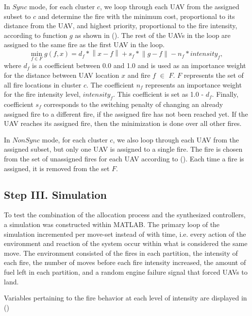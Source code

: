 \documentclass[journal]{IEEEtran}
\newcommand{\norm}[1]{\left\lVert#1\right\rVert}
\begin{document}
In $Sync$  mode, for each cluster $c$, we loop through each UAV from the assigned subset to $c$ and determine the fire with the minimum cost, proportional to its distance from the UAV, and highest priority, proportional to the fire intensity, according to function $g$ as shown in (). The rest of the UAVs in the loop are assigned to the same fire as the first UAV in the loop.
\begin{equation}
\min_{f\in F} g(f,x) = d_{f}*\norm{x-f} + s_{f}*\norm{g-f} - n_{f}*intensity_{f},
\end{equation}
where $d_{f}$ is a coefficient between 0.0 and 1.0 and is used as an importance weight for the distance between UAV location $x$ and fire $f$ $\in$ $F$. $F$ represents the set of all fire locations in cluster $c$. The coefficient $n_{f}$ represents an importance weight for the fire intensity level, $intensity_{f}$. This coefficient is set as 1.0 - $d_{f}$. Finally, coefficient $s_{f}$ corresponds to the switching penalty of changing an already assigned fire to a different fire, if the assigned fire has not been reached yet. If the UAV reaches its assigned fire, then the minimization is done over all other fires.  

In $NonSync$ mode, for each cluster $c$, we also loop through each UAV from the assigned subset, but only one UAV is assigned to a single fire. The fire is chosen from the set of unassigned fires for each UAV according to (). Each time a fire is assigned, it is removed from the set $F$. 

\subsection{Step III. Simulation}

To test the combination of the allocation process and the synthesized controllers, a simulation was constructed within MATLAB. The primary loop of the simulation incremented per move-set instead of with time, i.e. every action of the environment and reaction of the system occur within what is considered the same move. The environment consisted of the fires in each partition, the intensity of each fire, the number of moves before each fire intensity increased, the amount of fuel left in each partition, and a random engine failure signal that forced UAVs to land.

Variables pertaining to the fire behavior at each level of intensity are displayed in ()
\end{document}
